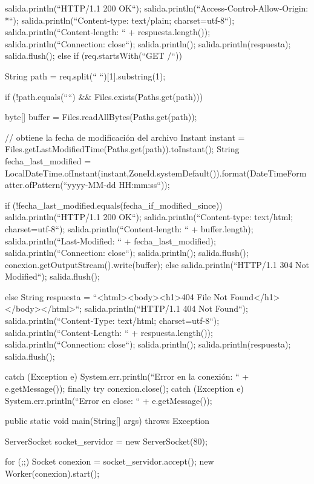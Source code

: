 \documentclass[11pt,a4paper,oneside]{book}
\begin{document}
\begin{SourceCode}
{{{{{          salida.println(``HTTP/1.1 200 OK``);
          salida.println(``Access-Control-Allow-Origin: *``);
          salida.println(``Content-type: text/plain; charset=utf-8``);
          salida.println(``Content-length: `` + respuesta.length());
          salida.println(``Connection: close``);
          salida.println();
          salida.println(respuesta);
          salida.flush();
        }
        else
        if (req.startsWith(``GET /``))
        {
          String path = req.split(`` ``)[1].substring(1);

          if (!path.equals(````) && Files.exists(Paths.get(path)))
          {
            byte[] buffer = Files.readAllBytes(Paths.get(path));

            // obtiene la fecha de modificación del archivo
            Instant instant = Files.getLastModifiedTime(Paths.get(path)).toInstant();
            String fecha_last_modified = LocalDateTime.ofInstant(instant,ZoneId.systemDefault()).format(DateTimeFormatter.ofPattern(``yyyy-MM-dd HH:mm:ss``));

            if (!fecha_last_modified.equals(fecha_if_modified_since))
            {
              salida.println(``HTTP/1.1 200 OK``);
              salida.println(``Content-type: text/html; charset=utf-8``);
              salida.println(``Content-length: `` + buffer.length);
              salida.println(``Last-Modified: `` + fecha_last_modified);
              salida.println(``Connection: close``);
              salida.println();
              salida.flush();
	            conexion.getOutputStream().write(buffer);
            }
            else
            {
              salida.println(``HTTP/1.1 304 Not Modified``);
              salida.flush();
            }
          }
          else
          {
            String respuesta = ``<html><body><h1>404 File Not Found</h1></body></html>``;
            salida.println(``HTTP/1.1 404 Not Found``);
            salida.println(``Content-Type: text/html; charset=utf-8``);
            salida.println(``Content-Length: `` + respuesta.length());
            salida.println(``Connection: close``);
            salida.println();
            salida.println(respuesta);
            salida.flush();
          }
        }
      }
      catch (Exception e)
      {
        System.err.println(``Error en la conexión: `` + e.getMessage());
      }
      finally
      {
        try
        {
          conexion.close();
        }
        catch (Exception e)
        {
          System.err.println(``Error en close: `` + e.getMessage());
        }
      }
    }
  }

  public static void main(String[] args) throws Exception
  {
    ServerSocket socket_servidor = new ServerSocket(80);

    for (;;)
    {
      Socket conexion = socket_servidor.accept();
      new Worker(conexion).start();
    }
  }
}
\end{SourceCode}
\end{document}
